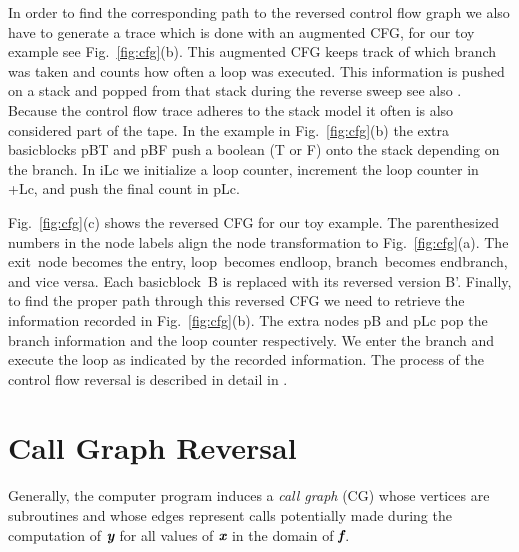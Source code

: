 \documentclass{book}
\newcommand{\entry}{entry}
\newcommand{\exit}{exit}
\newcommand{\Loop}{loop}
\newcommand{\EndLoop}{endloop}
\newcommand{\branch}{branch}
\newcommand{\EndBranch}{endbranch}
\newcommand{\basicblock}{basicblock}
\newcommand{\bmf}{\mbox{\bf\em f}}
\newcommand{\bmx}{\mbox{\bf\em x}}
\newcommand{\bmy}{\mbox{\bf\em y}}
\newcommand{\reffig}[1]{{Fig.~\ref{#1}}}
\begin{document}
In order to find the corresponding path to the reversed control flow graph 
we also have to generate a trace which is done with an augmented CFG,
for our toy example see \reffig{fig:cfg}(b).
This augmented CFG  keeps track of which branch was taken and counts how 
often a loop was 
executed.  
This information is pushed on  a stack and popped from that stack during the 
reverse sweep see also \cite{NULF04CFR}. Because the control flow trace 
adheres to the stack model it often is also considered part of the tape. 
In the example in \reffig{fig:cfg}(b) the extra {\basicblock}s pBT and pBF push 
a boolean (T or F) onto the stack depending on the branch. 
In iLc we initialize a loop counter, increment the loop counter in +Lc, 
and push the final count in pLc. 

\reffig{fig:cfg}(c) shows the reversed CFG for our toy example. 
The parenthesized numbers in the node labels align the 
node transformation to \reffig{fig:cfg}(a). 
The \exit\ node becomes 
the \entry, \Loop\ becomes \EndLoop, \branch\ becomes \EndBranch, and vice versa. 
Each \basicblock\  B is replaced with its reversed version B'.  
Finally, to find the proper path through this reversed CFG we need to retrieve 
the information recorded in  \reffig{fig:cfg}(b). The extra nodes pB and pLc 
pop the branch information and the loop counter respectively.  
We enter the branch and execute the loop as indicated by the recorded information. 
The process of the control flow reversal is described in detail in 
\cite{NULF04CFR}. 

\section{Call Graph Reversal} \label{sec:cgReversal}

Generally, the computer program 
induces a {\em call graph} (CG) \cite{ASU86}
whose vertices are subroutines and whose edges 
represent calls potentially made during the computation of $\bmy$ for all 
values of $\bmx$ in the domain of $\bmf$.
\end{document}
